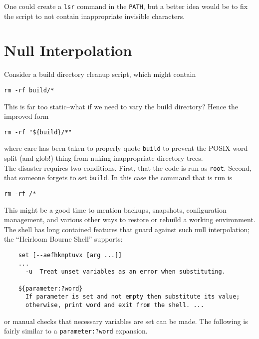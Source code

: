 \documentclass[10pt,a4paper]{article}
\begin{document}
One could create a \texttt{lsr} command in the \texttt{PATH},
but a better idea would be to fix the script to not contain
inappropriate invisible characters.

\clearpage
\section*{Null Interpolation}

Consider a build directory cleanup script, which might contain

\begin{lstlisting}
rm -rf build/*
\end{lstlisting}

This is far too static--what if we need to vary the build directory?
Hence the improved form

\begin{lstlisting}
rm -rf "${build}/*"
\end{lstlisting}

where care has been taken to properly quote \texttt{build} to
prevent the POSIX word split (and glob!) thing from nuking inappropriate
directory trees. \\

The disaster requires two conditions. First, that the code is run as
\texttt{root}. Second, that someone forgets to set
\texttt{build}. In this case the command that is run is

\begin{lstlisting}
rm -rf /*
\end{lstlisting}

This might be a good time to mention backups, snapshots, configuration
management, and various other ways to restore or rebuild a working
environment. The shell has long contained features that guard against
such null interpolation; the ``Heirloom Bourne Shell'' supports:

\begin{lstlisting}
    set [--aefhknptuvx [arg ...]]
    ...
      -u  Treat unset variables as an error when substituting.

    ${parameter:?word}
      If parameter is set and not empty then substitute its value;
      otherwise, print word and exit from the shell. ...
\end{lstlisting}

or manual checks that necessary variables are set can be made. The
following is fairly similar to a
\texttt{parameter:?word} expansion.
\end{document}
